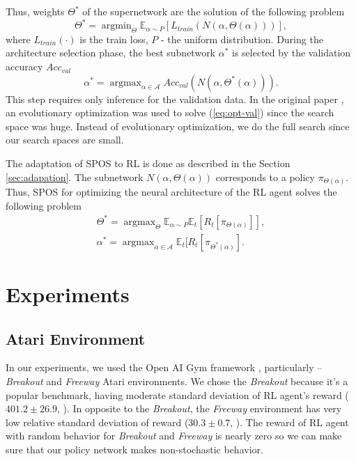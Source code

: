 \documentclass{svproc}
\newcommand{\argmin}{\mathop{\mathrm{argmin}}}
\newcommand{\argmax}{\mathop{\mathrm{argmax}}}
\begin{document}
Thus, weights $\Theta^*$ of the supernetwork are the solution of the following problem 
\[
\Theta^* = \argmin_{\Theta} \mathbb{E}_{\alpha\sim P} [ L_{train}(N(\alpha, \Theta(\alpha)))], 
\]
where $L_{train}(\cdot)$ is the train loss, $P$ - the uniform distribution.
During the architecture selection phase, the best subnetwork $\alpha^*$ is selected by the validation accuracy $Acc_{val}$
\begin{equation}
\label{eq:opt-val}
\alpha^* = \argmax_{\alpha \in \mathcal{A}} Acc_{val}(N(\alpha, \Theta^*(\alpha))).
\end{equation}
This step requires only inference for the validation data. 
In the original paper \cite{guo2019single}, an evolutionary optimization was used to solve (\ref{eq:opt-val}) since the search space was huge. Instead of evolutionary optimization, we do the full search since our search spaces are small.

The adaptation of SPOS to RL is done as described in the Section \ref{sec:adapation}. The subnetwork $N(\alpha, \Theta(\alpha))$ corresponds to a policy $\pi_{\Theta(\alpha)}$. 
Thus, SPOS for optimizing the neural architecture of the RL agent solves the following problem
\begin{align}
\Theta^* = \argmax_{\Theta} \mathbb{E}_{\alpha \sim P} \mathbb{E}_{t} [ R_{t} [\pi_{\Theta(\alpha)}]], \\
\alpha^* = \argmax_{\alpha \in \mathcal{A}} \mathbb{E}_{t} [ R_{t}[\pi_{\Theta^*(\alpha)}].
\end{align}









\section{Experiments}

\subsection{Atari Environment}
\label{sec:atari}


In our experiments, we used the Open AI Gym framework \cite{Brockman2016OpenAIG}, particularly --  \textit{Breakout} and \textit{Freeway} Atari environments.
We chose the \textit{Breakout} because it’s a popular benchmark, having moderate standard deviation of RL agent's reward ($401.2 \pm 26.9$, \cite{Humanlevel2015}). In opposite to the \textit{Breakout}, the \textit{Freeway} environment has very low relative standard deviation of reward ($30.3 \pm 0.7$, \cite{Humanlevel2015}).
The reward of RL agent with random behavior for \textit{Breakout} and \textit{Freeway} is nearly zero so we can make sure that our policy network makes non-stochastic behavior.
\end{document}
